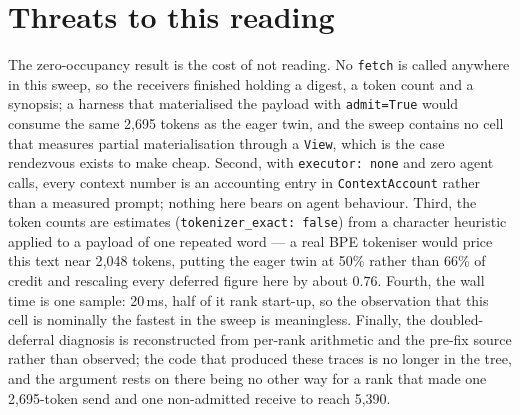\documentclass[11pt]{article}
\begin{document}
\section{Threats to this reading}

The zero-occupancy result is the cost of not reading. No \texttt{fetch} is called
anywhere in this sweep, so the receivers finished holding a digest, a token count and
a synopsis; a harness that materialised the payload with \texttt{admit=True} would
consume the same 2{,}695 tokens as the eager twin, and the sweep contains no cell
that measures partial materialisation through a \texttt{View}, which is the case
rendezvous exists to make cheap. Second, with \texttt{executor: none} and zero agent
calls, every context number is an accounting entry in \texttt{ContextAccount} rather
than a measured prompt; nothing here bears on agent behaviour. Third, the token
counts are estimates (\texttt{tokenizer\_exact: false}) from a character heuristic
applied to a payload of one repeated word --- a real BPE tokeniser would price this
text near 2{,}048 tokens, putting the eager twin at 50\% rather than 66\% of credit
and rescaling every deferred figure here by about $0.76$. Fourth, the wall time is
one sample: 20\,ms, half of it rank start-up, so the observation that this cell is
nominally the fastest in the sweep is meaningless. Finally, the doubled-deferral
diagnosis is reconstructed from per-rank arithmetic and the pre-fix source rather
than observed; the code that produced these traces is no longer in the tree, and the
argument rests on there being no other way for a rank that made one 2{,}695-token
send and one non-admitted receive to reach 5{,}390.
\end{document}
